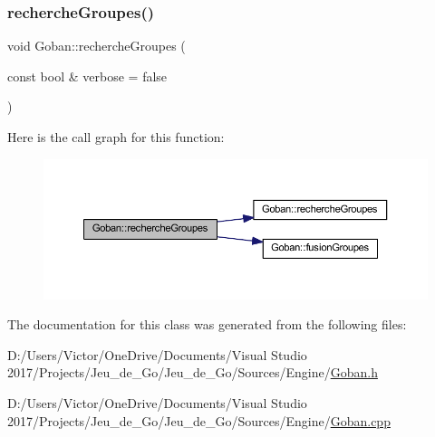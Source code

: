 \subsubsection{\texorpdfstring{recherche\+Groupes()}{rechercheGroupes()}\hspace{0.1cm}{\footnotesize\ttfamily [2/2]}}
{\footnotesize\ttfamily void Goban\+::recherche\+Groupes (\begin{DoxyParamCaption}\item[{const bool \&}]{verbose = {\ttfamily false} }\end{DoxyParamCaption})}

Here is the call graph for this function\+:\nopagebreak
\begin{figure}[H]
\begin{center}
\leavevmode
\includegraphics[width=350pt]{class_goban_abd6663ff5c440bf6def073db02df83f0_cgraph}
\end{center}
\end{figure}


The documentation for this class was generated from the following files\+:\begin{DoxyCompactItemize}
\item 
D\+:/\+Users/\+Victor/\+One\+Drive/\+Documents/\+Visual Studio 2017/\+Projects/\+Jeu\+\_\+de\+\_\+\+Go/\+Jeu\+\_\+de\+\_\+\+Go/\+Sources/\+Engine/\hyperlink{_goban_8h}{Goban.\+h}\item 
D\+:/\+Users/\+Victor/\+One\+Drive/\+Documents/\+Visual Studio 2017/\+Projects/\+Jeu\+\_\+de\+\_\+\+Go/\+Jeu\+\_\+de\+\_\+\+Go/\+Sources/\+Engine/\hyperlink{_goban_8cpp}{Goban.\+cpp}\end{DoxyCompactItemize}
